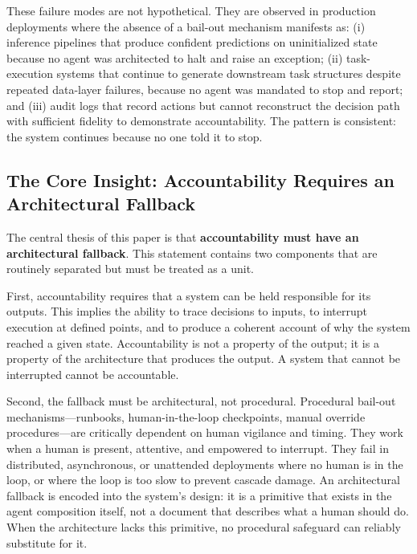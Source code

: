 These failure modes are not hypothetical. They are observed in production deployments where the absence of a bail-out mechanism manifests as: (i) inference pipelines that produce confident predictions on uninitialized state because no agent was architected to halt and raise an exception; (ii) task-execution systems that continue to generate downstream task structures despite repeated data-layer failures, because no agent was mandated to stop and report; and (iii) audit logs that record actions but cannot reconstruct the decision path with sufficient fidelity to demonstrate accountability. The pattern is consistent: the system continues because no one told it to stop.

\subsection*{The Core Insight: Accountability Requires an Architectural Fallback}

The central thesis of this paper is that \textbf{accountability must have an architectural fallback}. This statement contains two components that are routinely separated but must be treated as a unit. 

First, accountability requires that a system can be held responsible for its outputs. This implies the ability to trace decisions to inputs, to interrupt execution at defined points, and to produce a coherent account of why the system reached a given state. Accountability is not a property of the output; it is a property of the architecture that produces the output. A system that cannot be interrupted cannot be accountable.

Second, the fallback must be architectural, not procedural. Procedural bail-out mechanisms—runbooks, human-in-the-loop checkpoints, manual override procedures—are critically dependent on human vigilance and timing. They work when a human is present, attentive, and empowered to interrupt. They fail in distributed, asynchronous, or unattended deployments where no human is in the loop, or where the loop is too slow to prevent cascade damage. An architectural fallback is encoded into the system's design: it is a primitive that exists in the agent composition itself, not a document that describes what a human should do. When the architecture lacks this primitive, no procedural safeguard can reliably substitute for it.

